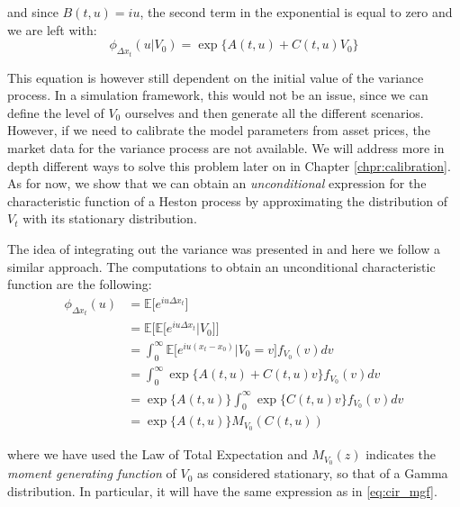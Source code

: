 and since $B(t,u)  = i u$, the second term in the exponential is equal to zero and we are left with:
\begin{equation}
\label{eq:chf_V0}
\phi_{\Delta x_t}(u|V_0) =  \exp\{A(t,u) + C(t,u) V_0\}
\end{equation}




This equation is however still dependent on the initial value of the variance process. In a simulation framework, this would not be an issue, since we can define the level of $V_0$ ourselves and then generate all the different scenarios. However, if we need to calibrate the model parameters from asset prices, the market data for the variance process are not available. We will address more in depth different ways to solve this problem later on in Chapter \ref{chpr:calibration}. As for now, we show that we can obtain an \textit{unconditional} expression for the characteristic function of a Heston process by approximating the distribution of $V_t$ with its stationary distribution.

The idea of integrating out the variance was presented in \cite{DRAGULESCU2002} and here we follow a similar approach.
The computations to obtain an unconditional characteristic function are the following:
\begin{equation*}
\begin{split}
	\phi_{\Delta x_t}(u) &= \mathbb{E}\big[e^{i u \Delta x_t} \big] \\
	&= \mathbb{E}\big[ \mathbb{E}\big[ e^{i u \Delta x_t} | V_0\big] \big]\\
	&=  \int_{0}^{\infty} \mathbb{E}\big[e^{i u ( x_t - x_0)}|V_0 = v \big] f_{V_0}(v) dv \\
	&= \int_{0}^{\infty} \exp\{A(t,u) + C(t,u) v\} f_{V_0}(v) dv \\
	&=  \exp\{A(t,u)\} \int_{0}^{\infty}  \exp \{C(t,u) v\} f_{V_0}(v) dv\\
	&= \exp\{A(t,u) \} M_{V_0}(C(t,u))
\end{split}
\end{equation*}

where we have used the Law of Total Expectation and $M_{V_0}(z)$ indicates the \textit{moment generating function} of $V_0$ as considered stationary, so that of a Gamma distribution. In particular, it will have the same expression as in \eqref{eq:cir_mgf}.



